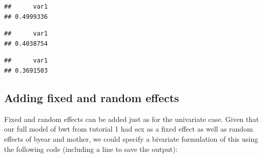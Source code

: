 \documentclass[
  12pt,
]{book}
\newenvironment{Shaded}{\begin{snugshade}}{\end{snugshade}}
\newcommand{\FloatTok}[1]{\textcolor[rgb]{0.00,0.00,0.81}{#1}}
\newcommand{\FunctionTok}[1]{\textcolor[rgb]{0.00,0.00,0.00}{#1}}
\newcommand{\NormalTok}[1]{#1}
\newcommand{\OtherTok}[1]{\textcolor[rgb]{0.56,0.35,0.01}{#1}}
\newcommand{\SpecialCharTok}[1]{\textcolor[rgb]{0.00,0.00,0.00}{#1}}
\newcommand{\StringTok}[1]{\textcolor[rgb]{0.31,0.60,0.02}{#1}}
\begin{document}
\begin{verbatim}
##      var1 
## 0.4999336
\end{verbatim}

\begin{Shaded}
\end{Shaded}

\begin{verbatim}
##      var1 
## 0.4038754
\end{verbatim}

\begin{Shaded}
\end{Shaded}

\begin{verbatim}
##      var1 
## 0.3691503
\end{verbatim}

\hypertarget{adding-fixed-and-random-effects-1}{%
\subsection{Adding fixed and random effects}\label{adding-fixed-and-random-effects-1}}

Fixed and random effects can be added just as for the univariate case.
Given that our full model of bwt from tutorial 1 had sex as a fixed effect as well as random effects of byear and mother, we could specify a bivariate formulation of this using the following code (including a line to save the output):
\end{document}
